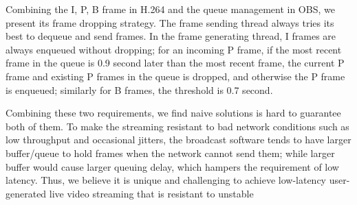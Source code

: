 Combining the I, P, B frame in H.264 and the queue management in OBS, we present its frame dropping strategy. The frame sending thread always tries its best to dequeue and send frames. In the frame generating thread, I frames are always enqueued without dropping; for an incoming P frame, if the most recent frame in the queue is 0.9 second later than the most recent frame, the current P frame and existing P frames in the queue is dropped, and otherwise the P frame is enqueued; similarly for B frames, the threshold is 0.7 second.


Combining these two requirements, we find naive solutions is hard to guarantee both of them. To make the streaming resistant to bad network conditions such as low throughput and occasional jitters, the broadcast software tends to have larger buffer/queue to hold frames when the network cannot send them; while larger buffer would cause larger queuing delay, which hampers the requirement of low latency. Thus, we believe it is unique and challenging to achieve low-latency user-generated live video streaming that is resistant to unstable

\fi

\iffalse
\subsection{Commercial Applications}
To validate whether the commercial service provider has solved the issue, we repeat the same black box experiment on two commercial platforms(Twitch, Douyu) and three streamer(OBS, Douyu Tools, XSplit) respectively.
\fi
